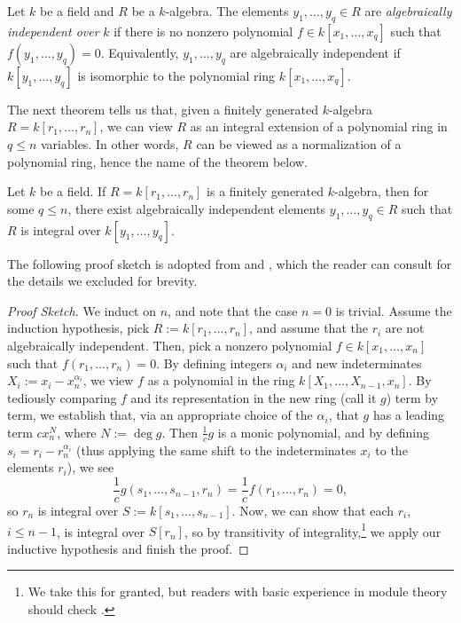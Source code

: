 \documentclass{article}
\begin{document}
\begin{definition}\label{algind}
Let $k$ be a field and $R$ be a $k$-algebra. The elements $y_1,\ldots, y_q\in R$ are \textit{algebraically independent over} $k$ if there is no nonzero polynomial $f\in k[x_1, \ldots, x_q]$ such that $f(y_1,\ldots, y_q) = 0$. Equivalently, $y_1,\ldots, y_q$ are algebraically independent if $k[y_1,\ldots, y_q]$ is isomorphic to the polynomial ring $k[x_1, \ldots, x_q]$.
\end{definition}

The next theorem tells us that, given a finitely generated $k$-algebra $R = k[r_1,\ldots, r_n]$, we can view $R$ as an integral extension of a polynomial ring in $q\leq n$ variables. In other words, $R$ can be viewed as a normalization of a polynomial ring, hence the name of the theorem below.

\begin{theorem}\label{noether}
Let $k$ be a field. If $R = k[r_1, \ldots, r_n]$ is a finitely generated $k$-algebra, then for some $q\leq n$, there exist algebraically independent elements $y_1, \ldots, y_q\in R$ such that $R$ is integral over $k[y_1, \ldots, y_q]$.
\end{theorem}

The following proof sketch is adopted from \cite{dummit} and \cite{mumford}, which the reader can consult for the details we excluded for brevity.

\begin{proof}[Proof Sketch]\renewcommand{\qedsymbol}{$\bullet$}
We induct on $n$, and note that the case $n=0$ is trivial. Assume the induction hypothesis, pick $R := k[r_1, \ldots, r_n]$, and assume that the $r_i$ are not algebraically independent. Then, pick a nonzero polynomial $f\in k[x_1,\ldots, x_n]$ such that $f(r_1,\ldots, r_n) = 0$. By defining integers $\alpha_i$ and new indeterminates $X_i:= x_i-x_n^{\alpha_i}$, we view $f$ as a polynomial in the ring $k[X_1, \ldots, X_{n-1}, x_n]$. By tediously comparing $f$ and its representation in the new ring (call it $g$) term by term, we establish that, via an appropriate choice of the $\alpha_i$, that $g$ has a leading term $cx_n^N$, where $N := \deg g$. Then $\frac 1cg$ is a monic polynomial, and by defining $s_i = r_i - r_n^{\alpha_i}$ (thus applying the same shift to the indeterminates $x_i$ to the elements $r_i$), we see
$$\frac 1cg(s_1,\ldots, s_{n-1}, r_n) = \frac 1cf(r_1, \ldots, r_n) = 0,$$
so $r_n$ is integral over $S := k[s_1,\ldots, s_{n-1}]$.  Now, we can show that each $r_i$, $i\leq n-1$, is integral over $S[r_n]$, so by transitivity of integrality,\footnote{We take this for granted, but readers with basic experience in module theory should check \parencite[p. 692-693]{dummit}.} we apply our inductive hypothesis and finish the proof.
\end{proof}
\end{document}

